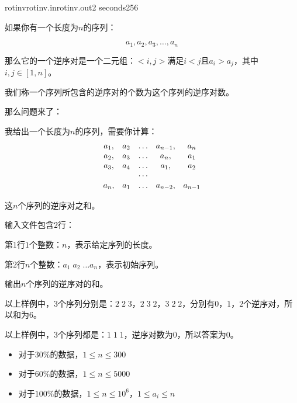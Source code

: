 \documentclass[11pt,a4paper,oneside]{article}
\begin{document}
	
\begin{problem}{rotinv}{rotinv.in}{rotinv.out}{2 seconds}{256}
	
	如果你有一个长度为$n$的序列：
	
	$$a_1,a_2,a_3,\dots,a_n$$
	
	那么它的一个逆序对是一个二元组：$<i,j>$满足$i<j$且$a_i > a_j$，其中$i, j \in [1,n]$。
	
	我们称一个序列所包含的逆序对的个数为这个序列的逆序对数。
	
	那么问题来了：
	
	我给出一个长度为$n$的序列，需要你计算：
	$$
		\begin{array}{c c c c c}
			a_1,&a_2&\dots&a_{n-1},&a_n	\\
			a_2,& a_3& \dots& a_{n},   & a_1	\\
			a_3,& a_4& \dots& a_1,       & a_2	\\
			& & \cdots 	& & \\
			a_n,& a_1& \dots& a_{n-2},& a_{n-1}	\\
		\end{array}
	$$
	
	这$n$个序列的逆序对之和。

	\InputFile
	输入文件包含$2$行：
	
	第$1$行$1$个整数：$n$，表示给定序列的长度。
	
	第$2$行$n$个整数：$a_1 \; a_2 \; \dots a_n $，表示初始序列。
	
	\OutputFile
	
	输出$n$个序列的逆序对的和。
	
	\Example
	
	\begin{example}
	\end{example}
	
	以上样例中，$3$个序列分别是：$2 \; 2 \; 3 $，$2 \; 3 \; 2 $，$3 \; 2 \; 2 $，分别有$0$，$1$，$2$个逆序对，所以和为$6$。
	
	\begin{example}
		\exmp{
			3
			1 1 1
		}{
			0
		}%
	\end{example}
	
	以上样例中，$3$个序列都是：$ 1 \; 1 \; 1 $，逆序对数为$0$，所以答案为$0$。
	
	\Note
	\begin{itemize}
		\item 对于$30\%$的数据，$1 \leq n \leq 300$
		\item 对于$60\%$的数据，$1 \leq n \leq 5000$
		\item 对于$100\%$的数据，$1 \leq n \leq 10^6$，$ 1 \leq a_i \leq n$
	\end{itemize}

\end{problem}
\end{document}
